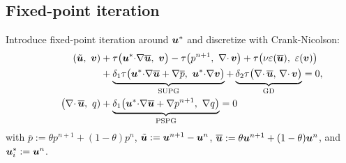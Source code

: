 \documentclass[review,onefignum,onetabnum]{siamart190516}
\begin{document}
\subsection{Fixed-point iteration}

Introduce fixed-point iteration around ${\boldsymbol u}^*$ and
discretize with Crank-Nicolson:
\begin{equation}
  \begin{aligned}
    \left( \tilde{{\boldsymbol u}} ,\  {\boldsymbol v} \right) 
    &+ \tau \big( {\boldsymbol u}^* {\cdot} \nabla \overline{{\boldsymbol u}},\ {\boldsymbol v} \big)
    - \tau \big( p^{n+1},\ \nabla{\cdot\,} {\boldsymbol v} \big) + 
    \tau \big( \nu \varepsilon(\overline{{\boldsymbol u}}),\ \varepsilon({\boldsymbol v}) \big) \\
    & 
    +  
    \underbrace{\delta_1 \tau \big( {\boldsymbol u}^* {\cdot} \nabla \overline{{\boldsymbol u}} + \nabla \overline{p}, \
    {\boldsymbol u}^* {\cdot} \nabla {\boldsymbol v}\big)}_{\text{SUPG}}  +
    \underbrace{\delta_2 \tau \big(\nabla{\cdot\,} \overline{{\boldsymbol u}}, \, \nabla{\cdot\,} {\boldsymbol v} \big)}_{\text{GD}}
    =0, \\
    \hspace{2.2em} 
    \big( \nabla{\cdot\,} \overline{{\boldsymbol u}},\ q)&
    + \underbrace{\delta_1 \big( {\boldsymbol u}^* {\cdot} \nabla \overline{{\boldsymbol u}} + \nabla p^{n+1} ,\ \nabla q \big)}_{\text{PSPG}} = 0 
  \end{aligned}
\end{equation}
with
$\overline{p} := \theta p^{n+1} + (1-\theta) p^{n}$,
$\tilde{{\boldsymbol u}} := {\boldsymbol u}^{n+1} - {\boldsymbol u}^{n}$,
$\overline{{\boldsymbol u}} := \theta {\boldsymbol u}^{n+1} + (1-\theta) {\boldsymbol u}^{n}$, 
and ${\boldsymbol u}^*_i:={\boldsymbol u}^n$.

%
%



%
% 
%
%
\end{document}
